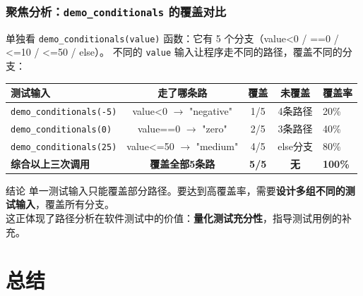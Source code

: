 \documentclass[presentation,aspectratio=169]{ctexbeamer}
\begin{document}

\begin{frame}
\frametitle{聚焦分析：\texttt{demo\_conditionals} 的覆盖对比}
{\footnotesize 单独看 \texttt{demo\_conditionals(value)} 函数：它有 5 个分支（value<0 / ==0 / <=10 / <=50 / else）。
不同的 \texttt{value} 输入让程序走不同的路径，覆盖不同的分支：}

\vspace{0.1cm}
\begin{table}
\centering
{\footnotesize
\begin{tabular}{lcccl}
\toprule
\textbf{测试输入} & \textbf{走了哪条路} & \textbf{覆盖} & \textbf{未覆盖} & \textbf{覆盖率} \\
\midrule
\texttt{demo\_conditionals(-5)} & value<0 $\rightarrow$ "negative" & 1/5 & 4条路径 & 20\% \\
\texttt{demo\_conditionals(0)} & value==0 $\rightarrow$ "zero" & 2/5 & 3条路径 & 40\% \\
\texttt{demo\_conditionals(25)} & value<=50 $\rightarrow$ "medium" & 4/5 & else分支 & 80\% \\
\textbf{综合以上三次调用} & \textbf{覆盖全部5条路} & \textbf{5/5} & \textbf{无} & \textbf{100\%} \\
\bottomrule
\end{tabular}}
\end{table}

\vspace{0.1cm}
{\footnotesize
\begin{block}{结论}
单一测试输入只能覆盖部分路径。要达到高覆盖率，需要\textbf{设计多组不同的测试输入}，覆盖所有分支。\\[2pt]
这正体现了路径分析在软件测试中的价值：\textbf{量化测试充分性}，指导测试用例的补充。
\end{block}}
\end{frame}


\section{总结}
\end{document}
